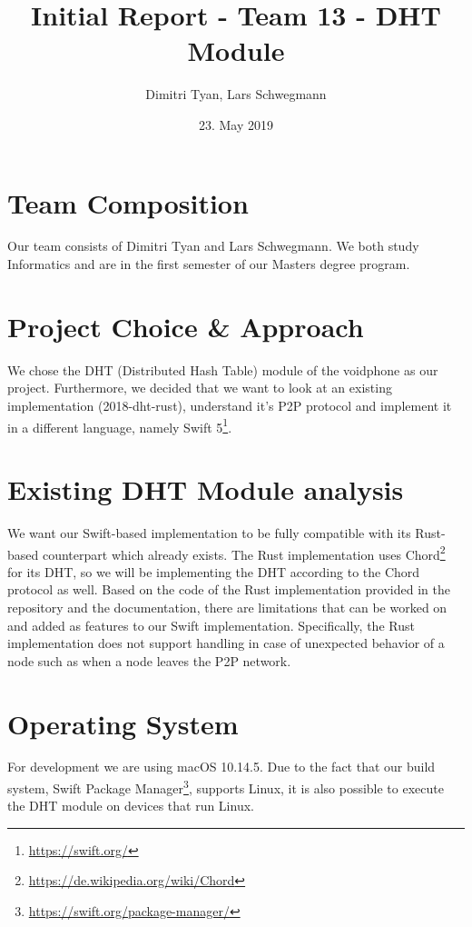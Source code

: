 \documentclass{article}
\title{Initial Report - Team 13 - DHT Module}
\author{Dimitri Tyan, Lars Schwegmann}
\date{23. May 2019}
\begin{document}
\maketitle

\section{Team Composition}

Our team consists of Dimitri Tyan and Lars Schwegmann. We both study Informatics and are in the first semester of our Masters degree program.


\section{Project Choice \& Approach}

We chose the DHT (Distributed Hash Table) module of the voidphone as our project. Furthermore, we decided that we want to look at an existing implementation (2018-dht-rust), understand it's P2P protocol and implement it in a different language, namely Swift 5\footnote{\url{https://swift.org/}}.

\section{Existing DHT Module analysis}

We want our Swift-based implementation to be fully compatible with its Rust-based counterpart which already exists. The Rust implementation uses Chord\footnote{\url{https://de.wikipedia.org/wiki/Chord}} for its DHT, so we will be implementing the DHT according to the Chord protocol as well. Based on the code of the Rust implementation provided in the repository and the documentation, there are limitations that can be worked on and added as features to our Swift implementation. Specifically, the Rust implementation does not support handling in case of unexpected behavior of a node such as when a node leaves the P2P network. 

\section{Operating System}
For development we are using macOS 10.14.5. Due to the fact that our build system, Swift Package Manager\footnote{\url{https://swift.org/package-manager/}}, supports Linux, it is also possible to execute the DHT module on devices that run Linux.
\end{document}
